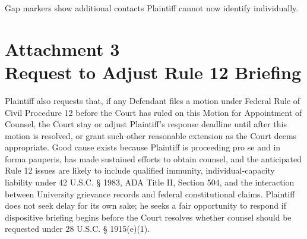 \documentclass[12pt]{article}
\begin{document}
\doublespacing
\makebox[0pt][r]{$\triangleright$\hspace{0.45em}}Gap markers show additional contacts Plaintiff cannot now identify individually.
\label{attachment:counsel-efforts-end}

\newpage

\doublespacing
{}
{}%
\label{attachment:counsel-briefing}
\section*{Attachment 3\\Request to Adjust Rule 12 Briefing}

Plaintiff also requests that, if any Defendant files a motion under Federal Rule of Civil Procedure 12 before the Court has ruled on this Motion for Appointment of Counsel, the Court stay or adjust Plaintiff's response deadline until after this motion is resolved, or grant such other reasonable extension as the Court deems appropriate. Good cause exists because Plaintiff is proceeding pro se and in forma pauperis, has made sustained efforts to obtain counsel, and the anticipated Rule 12 issues are likely to include qualified immunity, individual-capacity liability under 42 U.S.C. \S{} 1983, ADA Title II, Section 504, and the interaction between University grievance records and federal constitutional claims. Plaintiff does not seek delay for its own sake; he seeks a fair opportunity to respond if dispositive briefing begins before the Court resolves whether counsel should be requested under 28 U.S.C. \S{} 1915(e)(1).
\label{attachment:counsel-briefing-end}
\end{document}
